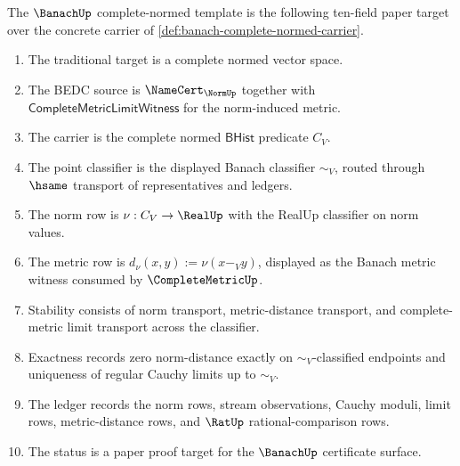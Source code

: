 \begin{definition}
\label{def:banach-complete-normed-template-obligations}
The $\BanachUp$ complete-normed template is the following ten-field paper
target over the concrete carrier of
\autoref{def:banach-complete-normed-carrier}.
\begin{enumerate}
\item The traditional target is a complete normed vector space.
\item The BEDC source is $\NameCert_{\NormUp}$ together with
$\mathsf{CompleteMetricLimitWitness}$ for the norm-induced metric.
\item The carrier is the complete normed $\mathsf{BHist}$ predicate $C_V$.
\item The point classifier is the displayed Banach classifier $\sim_V$,
routed through $\hsame$ transport of representatives and ledgers.
\item The norm row is $\nu:C_V\to\RealUp$ with the RealUp classifier on norm
values.
\item The metric row is $d_\nu(x,y):=\nu(x-_V y)$, displayed as the
Banach metric witness consumed by $\CompleteMetricUp$.
\item Stability consists of norm transport, metric-distance transport, and
complete-metric limit transport across the classifier.
\item Exactness records zero norm-distance exactly on $\sim_V$-classified
endpoints and uniqueness of regular Cauchy limits up to $\sim_V$.
\item The ledger records the norm rows, stream observations, Cauchy moduli,
limit rows, metric-distance rows, and $\RatUp$ rational-comparison rows.
\item The status is a paper proof target for the $\BanachUp$ certificate
surface.
\end{enumerate}
\end{definition}

